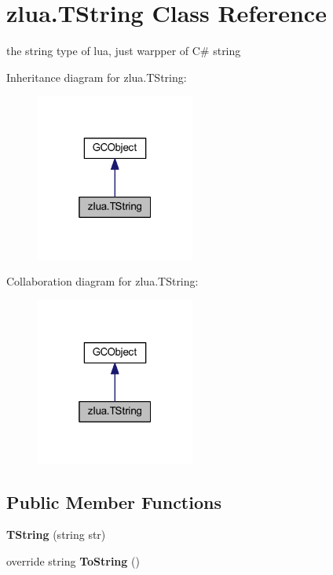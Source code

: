 \hypertarget{classzlua_1_1_t_string}{}\section{zlua.\+T\+String Class Reference}
\label{classzlua_1_1_t_string}


the string type of lua, just warpper of C\# string  




Inheritance diagram for zlua.\+T\+String\+:
\nopagebreak
\begin{figure}[H]
\begin{center}
\leavevmode
\includegraphics[width=148pt]{classzlua_1_1_t_string__inherit__graph}
\end{center}
\end{figure}


Collaboration diagram for zlua.\+T\+String\+:
\nopagebreak
\begin{figure}[H]
\begin{center}
\leavevmode
\includegraphics[width=148pt]{classzlua_1_1_t_string__coll__graph}
\end{center}
\end{figure}
\subsection*{Public Member Functions}
\begin{DoxyCompactItemize}
\item 
\mbox{\label{classzlua_1_1_t_string_aa8a0265433abc7f66b052c192510e5e6}} 
{\bfseries T\+String} (string str)
\item 
\mbox{\label{classzlua_1_1_t_string_a1ae6d043e64e48ebd9ad4ac6b118edf3}} 
override string {\bfseries To\+String} ()
\end{DoxyCompactItemize}
